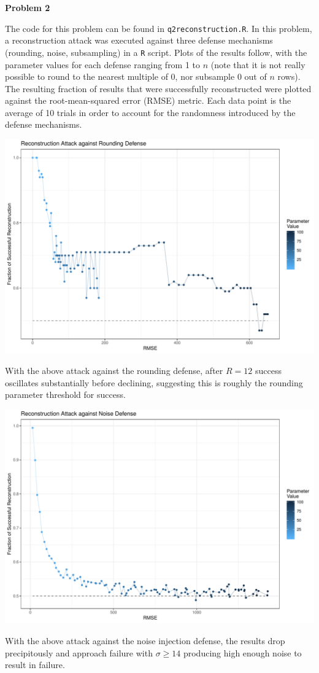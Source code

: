 \documentclass[12pt]{article}
\begin{document}
{\large\textbf{Problem 2}}

The code for this problem can be found in \texttt{q2reconstruction.R}. In this problem, a reconstruction attack was executed against three defense mechanisms (rounding, noise, subsampling) in a \texttt{R} script. Plots of the results follow, with the parameter values for each defense ranging from 1 to $n$ (note that it is not really possible to round to the nearest multiple of 0, nor subsample 0 out of $n$ rows). The resulting fraction of results that were successfully reconstructed were plotted against the root-mean-squared error (RMSE) metric. Each data point is the average of 10 trials in order to account for the randomness introduced by the defense mechanisms.
\begin{center}
\includegraphics[width=\textwidth]{figs/attackrounding}
\end{center}
With the above attack against the rounding defense, after $R = 12$ success oscillates substantially before declining, suggesting this is roughly the rounding parameter threshold for success.

\begin{center}
\includegraphics[width=\textwidth]{figs/attacknoise}
\end{center}
With the above attack against the noise injection defense, the results drop precipitously and approach failure with $\sigma \geq 14$ producing high enough noise to result in failure.
\end{document}
